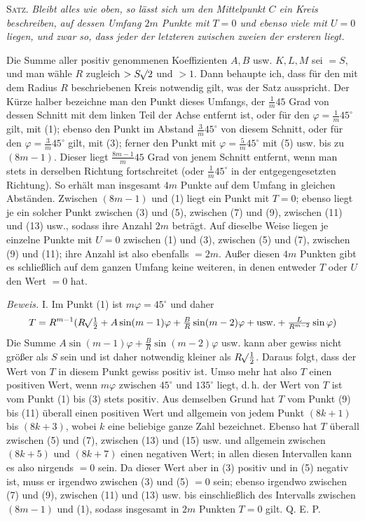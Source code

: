 \textsc{Satz.} \textit{Bleibt alles wie oben, so lässt sich um den Mittelpunkt $C$ ein Kreis beschreiben,}
\textit{auf dessen Umfang $2m$ Punkte mit $T=0$ und ebenso viele mit $U=0$ liegen, und zwar so, dass jeder der letzteren zwischen zweien der ersteren liegt.}

Die Summe aller positiv genommenen Koeffizienten $A,B$ usw. $K,L,M$ sei $=S$, und man wähle $R$ zugleich $>S\mathord{{}^{}\!\surd}2$ und $>1$. Dann behaupte ich, dass für den mit dem Radius $R$ beschriebenen Kreis notwendig gilt, was der Satz ausspricht. Der Kürze halber bezeichne man den Punkt dieses Umfangs, der $\frac1m45$ Grad von dessen Schnitt mit dem linken Teil der Achse entfernt ist, oder für den $\varphi=\frac1m45^\circ$ gilt, mit (1); ebenso den Punkt im Abstand $\frac3m45^\circ$ von diesem Schnitt, oder für den $\varphi=\frac3m45^\circ$ gilt, mit (3); ferner den Punkt mit $\varphi=\frac5m45^\circ$ mit (5) usw. bis zu $(8m-1)$. Dieser liegt $\frac{8m-1}m45$ Grad von jenem Schnitt entfernt, wenn man stets in derselben Richtung fortschreitet (oder $\frac1m45^\circ$ in der entgegengesetzten Richtung). So erhält man insgesamt $4m$ Punkte auf dem Umfang in gleichen Abständen. Zwischen $(8m-1)$ und (1) liegt ein Punkt mit $T=0$; ebenso liegt je ein solcher Punkt zwischen (3) und (5), zwischen (7) und (9), zwischen (11) und (13) usw., sodass ihre Anzahl $2m$ beträgt. Auf dieselbe Weise liegen je einzelne Punkte mit $U=0$ zwischen (1) und (3), zwischen (5) und (7), zwischen (9) und (11); ihre Anzahl ist also ebenfalls $=2m$. Außer diesen $4m$ Punkten gibt es schließlich auf dem ganzen Umfang keine weiteren, in denen entweder $T$ oder $U$ den Wert $=0$ hat.

\textit{Beweis.} I. Im Punkt (1) ist $m\varphi=45^\circ$ und daher
\[ T=R^{m-1}(R\mathord{{}^{}\!\surd}\tfrac12+A\sin(m-1)\varphi+\tfrac BR\sin(m-2)\varphi+\text{usw.}+\tfrac L{R^{m-2}}\sin\varphi)
\]
Die Summe $A\sin(m-1)\varphi+\frac BR\sin(m-2)\varphi$ usw. kann aber gewiss nicht größer als $S$ sein und ist daher notwendig kleiner als $R\mathord{{}^{}\!\surd}\frac12$. Daraus folgt, dass der Wert von $T$ in diesem Punkt gewiss positiv ist. Umso mehr hat also $T$ einen positiven Wert, wenn $m\varphi$ zwischen $45^\circ$ und $135^\circ$ liegt, d.\,h. der Wert von $T$ ist vom Punkt (1) bis (3) stets positiv. Aus demselben Grund hat $T$ vom Punkt (9) bis (11) überall einen positiven Wert und allgemein von jedem Punkt $(8k+1)$ bis $(8k+3)$, wobei $k$ eine beliebige ganze Zahl bezeichnet. Ebenso hat $T$ überall zwischen (5) und (7), zwischen (13) und (15) usw. und allgemein zwischen $(8k+5)$ und $(8k+7)$ einen negativen Wert; in allen diesen Intervallen kann es also nirgends $=0$ sein. Da dieser Wert aber in (3) positiv und in (5) negativ ist, muss er irgendwo zwischen (3) und (5) $=0$ sein; ebenso irgendwo zwischen (7) und (9), zwischen (11) und (13) usw.
bis einschließlich des Intervalls zwischen $(8m-1)$ und (1), sodass insgesamt in $2m$ Punkten $T=0$ gilt. Q. E. P.

